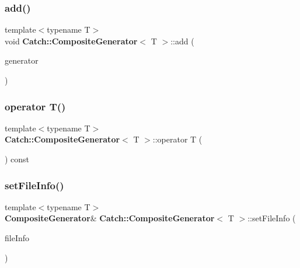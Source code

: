 \subsubsection{add()}
{\footnotesize\ttfamily template$<$typename T$>$ \\
void \textbf{ Catch\+::\+Composite\+Generator}$<$ T $>$\+::add (\begin{DoxyParamCaption}\item[{const \textbf{ I\+Generator}$<$ T $>$ $\ast$}]{generator }\end{DoxyParamCaption})\hspace{0.3cm}{\ttfamily [inline]}}

\mbox{\label{class_catch_1_1_composite_generator_a83d6c941e2e735b9528e6e832f7b76e7}} 
\subsubsection{operator T()}
{\footnotesize\ttfamily template$<$typename T$>$ \\
\textbf{ Catch\+::\+Composite\+Generator}$<$ T $>$\+::operator T (\begin{DoxyParamCaption}{ }\end{DoxyParamCaption}) const\hspace{0.3cm}{\ttfamily [inline]}}

\mbox{\label{class_catch_1_1_composite_generator_ac3c57cf4ca5472f440bf71e2936bcd4a}} 
\subsubsection{set\+File\+Info()}
{\footnotesize\ttfamily template$<$typename T$>$ \\
\textbf{ Composite\+Generator}\& \textbf{ Catch\+::\+Composite\+Generator}$<$ T $>$\+::set\+File\+Info (\begin{DoxyParamCaption}\item[{const char $\ast$}]{file\+Info }\end{DoxyParamCaption})\hspace{0.3cm}{\ttfamily [inline]}}

\mbox{\label{class_catch_1_1_composite_generator_a2e03f42df85cdd238aabd77a80b075d5}} 
